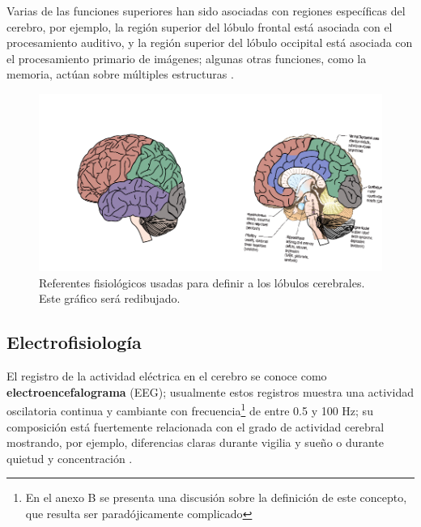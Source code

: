Varias de las funciones superiores han sido asociadas con regiones específicas del cerebro, por
ejemplo, la región superior del lóbulo frontal está asociada con el procesamiento auditivo, y la
región superior del lóbulo occipital está asociada con el procesamiento primario de imágenes;
algunas otras funciones, como la memoria, actúan sobre múltiples estructuras \cite{Clark98_2}.

\begin{figure}
\centering
\includegraphics[width=\linewidth]{./img_diagramas/cerebro_zonas.pdf} 
\caption{Referentes fisiológicos usadas para definir a los lóbulos cerebrales. 
Este gráfico será redibujado.
}
\label{lobulos}
\end{figure}


\subsection{Electrofisiología}

El registro de la actividad eléctrica en el cerebro se conoce como \textbf{electroencefalograma} 
(EEG); usualmente estos registros muestra una actividad oscilatoria continua y cambiante con 
frecuencia\footnote{En el anexo B se presenta una discusión sobre la definición de este concepto, 
que resulta ser paradójicamente complicado} de entre 0.5 y 100 Hz; su composición está fuertemente 
relacionada con el grado de actividad cerebral mostrando, por ejemplo, diferencias claras durante 
vigilia y sueño o durante quietud y concentración \cite{Clark98_2}.

